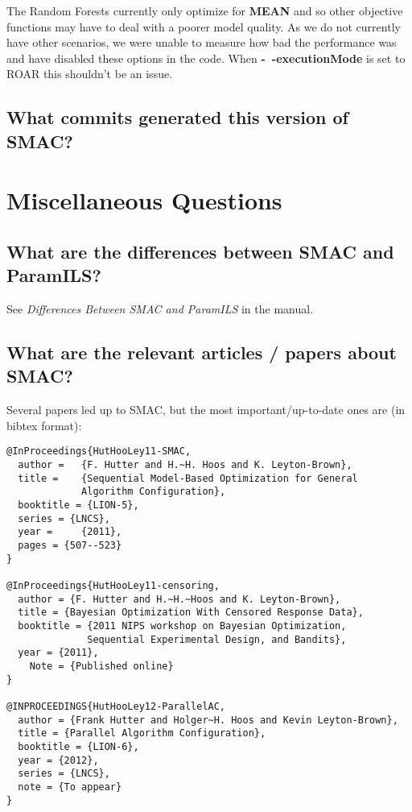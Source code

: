 \documentclass[11pt,letterpaper,oneside]{article}
\begin{document}
	The Random Forests currently only optimize for \textbf{MEAN} and so other objective functions may have to deal with a poorer model quality. As we do not currently have other scenarios, we were unable to measure how bad the performance was and have disabled these options in the code. When \textbf{-~$\!$-executionMode} is set to ROAR this shouldn't be an issue.

\subsection{What commits generated this version of SMAC?}



\section{Miscellaneous Questions}

\subsection{What are the differences between SMAC and ParamILS?}

	See \emph{Differences Between SMAC and ParamILS} in the manual.


\subsection{What are the relevant articles / papers about SMAC?}

Several papers led up to SMAC, but the most important/up-to-date ones are (in bibtex format):
\begin{verbatim}
@InProceedings{HutHooLey11-SMAC,
  author =	 {F. Hutter and H.~H. Hoos and K. Leyton-Brown},
  title =	 {Sequential Model-Based Optimization for General 
             Algorithm Configuration},
  booktitle = {LION-5},
  series = {LNCS},
  year =	 {2011},
  pages = {507--523}
}

@InProceedings{HutHooLey11-censoring,
  author = {F. Hutter and H.~H.~Hoos and K. Leyton-Brown},
  title = {Bayesian Optimization With Censored Response Data},
  booktitle = {2011 NIPS workshop on Bayesian Optimization, 
              Sequential Experimental Design, and Bandits},
  year = {2011},
	Note = {Published online}
}

@INPROCEEDINGS{HutHooLey12-ParallelAC,
  author = {Frank Hutter and Holger~H. Hoos and Kevin Leyton-Brown},
  title = {Parallel Algorithm Configuration},
  booktitle = {LION-6},
  year = {2012},
  series = {LNCS},
  note = {To appear}
}
\end{verbatim}
\end{document}

